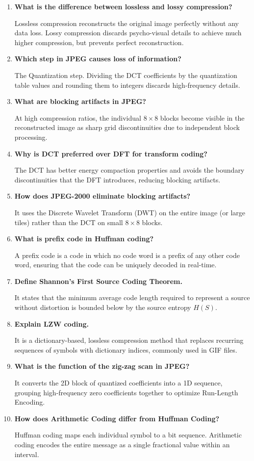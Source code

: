 \documentclass[12pt,a4paper]{article}
\newcommand{\Q}[1]{\textbf{#1}\par\noindent\ignorespaces}
\begin{document}
\begin{tcolorbox}[exambox, title={\textbf{Frequently Asked / Viva Questions}}]
\begin{enumerate}[leftmargin=*, itemsep=3.5pt, label=\arabic*.]
  \item \Q{What is the difference between lossless and lossy compression?} Lossless compression reconstructs the original image perfectly without any data loss. Lossy compression discards psycho-visual details to achieve much higher compression, but prevents perfect reconstruction.
  \item \Q{Which step in JPEG causes loss of information?} The Quantization step. Dividing the DCT coefficients by the quantization table values and rounding them to integers discards high-frequency details.
  \item \Q{What are blocking artifacts in JPEG?} At high compression ratios, the individual $8 \times 8$ blocks become visible in the reconstructed image as sharp grid discontinuities due to independent block processing.
  \item \Q{Why is DCT preferred over DFT for transform coding?} The DCT has better energy compaction properties and avoids the boundary discontinuities that the DFT introduces, reducing blocking artifacts.
  \item \Q{How does JPEG-2000 eliminate blocking artifacts?} It uses the Discrete Wavelet Transform (DWT) on the entire image (or large tiles) rather than the DCT on small $8 \times 8$ blocks.
  \item \Q{What is prefix code in Huffman coding?} A prefix code is a code in which no code word is a prefix of any other code word, ensuring that the code can be uniquely decoded in real-time.
  \item \Q{Define Shannon's First Source Coding Theorem.} It states that the minimum average code length required to represent a source without distortion is bounded below by the source entropy $H(S)$.
  \item \Q{Explain LZW coding.} It is a dictionary-based, lossless compression method that replaces recurring sequences of symbols with dictionary indices, commonly used in GIF files.
  \item \Q{What is the function of the zig-zag scan in JPEG?} It converts the 2D block of quantized coefficients into a 1D sequence, grouping high-frequency zero coefficients together to optimize Run-Length Encoding.
  \item \Q{How does Arithmetic Coding differ from Huffman Coding?} Huffman coding maps each individual symbol to a bit sequence. Arithmetic coding encodes the entire message as a single fractional value within an interval.
\end{enumerate}
\end{tcolorbox}
\end{document}
